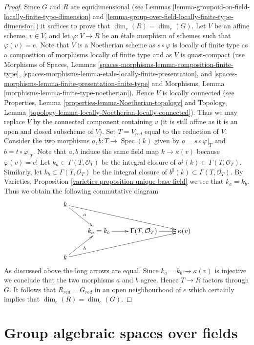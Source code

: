 \documentclass{stacks-project}
\theoremstyle{plain}
\theoremstyle{definition}
\theoremstyle{remark}
\numberwithin{equation}{subsection}
\def\Spec{\mathop{\mathrm{Spec}}}
\begin{document}
\begin{proof}
Since $G$ and $R$ are equidimensional (see
Lemmas \ref{lemma-groupoid-on-field-locally-finite-type-dimension} and
\ref{lemma-group-over-field-locally-finite-type-dimension})
it suffices to prove that $\dim_e(R) = \dim_e(G)$. Let $V$ be an affine scheme,
$v \in V$, and let $\varphi : V \to R$ be an \'etale morphism of schemes
such that $\varphi(v) = e$. Note that $V$ is a Noetherian scheme as
$s \circ \varphi$ is locally of finite type as a composition of morphisms
locally of finite type and as $V$ is quasi-compact (use
Morphisms of Spaces, Lemmas
\ref{spaces-morphisms-lemma-composition-finite-type},
\ref{spaces-morphisms-lemma-etale-locally-finite-presentation}, and
\ref{spaces-morphisms-lemma-finite-presentation-finite-type}
and
Morphisms, Lemma \ref{morphisms-lemma-finite-type-noetherian}).
Hence $V$ is locally connected (see
Properties, Lemma \ref{properties-lemma-Noetherian-topology}
and
Topology, Lemma \ref{topology-lemma-locally-Noetherian-locally-connected}).
Thus we may replace $V$ by the connected component containing $v$ (it
is still affine as it is an open and closed subscheme of $V$).
Set $T = V_{red}$ equal to the reduction of $V$. Consider the two
morphisms $a, b : T \to \Spec(k)$ given by
$a = s \circ \varphi|_T$ and $b = t \circ \varphi|_T$. Note that
$a, b$ induce the same field map $k \to \kappa(v)$ because $\varphi(v) = e$!
Let $k_a \subset \Gamma(T, \mathcal{O}_T)$ be the integral closure of
$a^\sharp(k) \subset \Gamma(T, \mathcal{O}_T)$. Similarly, let
$k_b \subset \Gamma(T, \mathcal{O}_T)$ be the integral closure of
$b^\sharp(k) \subset \Gamma(T, \mathcal{O}_T)$. By
Varieties, Proposition \ref{varieties-proposition-unique-base-field}
we see that $k_a = k_b$. Thus we obtain the following commutative diagram
$$
\xymatrix{
k \ar[rd]^a \ar[rrrd] \\
& k_a = k_b \ar[r] & \Gamma(T, \mathcal{O}_T) \ar[r] & \kappa(v) \\
k \ar[ru]_b \ar[rrru]
}
$$
As discussed above the long arrows are equal.
Since $k_a = k_b \to \kappa(v)$ is injective we conclude that
the two morphisms $a$ and $b$ agree. Hence $T \to R$ factors through $G$.
It follows that $R_{red} = G_{red}$ in an open neighbourhood of $e$
which certainly implies that $\dim_e(R) = \dim_e(G)$.
\end{proof}






\section{Group algebraic spaces over fields}
\label{section-group-algebraic-spaces-over-fields}
\end{document}
